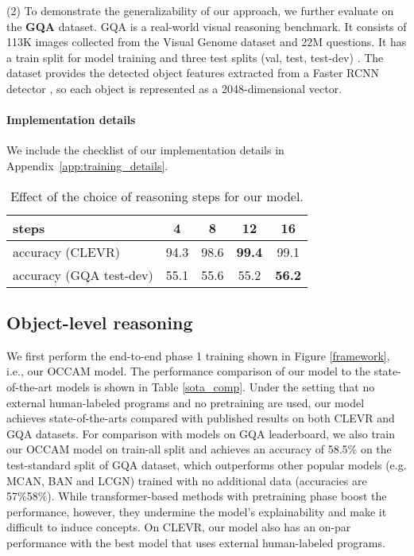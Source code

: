 \documentclass[10pt,twocolumn,letterpaper]{article}
\begin{document}
(2) To demonstrate the generalizability of our approach, we further evaluate on the \textbf{GQA} dataset.
GQA is a real-world visual reasoning benchmark. It consists of 113K images collected from the Visual Genome dataset \cite{krishna2017visual} and 22M questions. It has a train split for model training and three test splits (val, test, test-dev) \cite{hudson2019gqa}. The dataset provides the detected object features extracted from a Faster RCNN detector \cite{ren2015faster}, so each object is represented as a 2048-dimensional vector.


\vspace{-4mm}
\paragraph{Implementation details} We include the checklist of our implementation details in Appendix~\ref{app:training_details}.

\begin{table}[t!]
\small
    \centering
    \caption{\small{Effect of the choice of reasoning steps for our model.}}
    \begin{tabular}{l|cccc}
        \toprule
         steps & 4 & 8 & 12 & 16  \\
         \midrule
         accuracy (CLEVR) & 94.3 & 98.6 & \textbf{99.4} & 99.1 \\
         accuracy (GQA test-dev) & 55.1 & 55.6 & 55.2 & \textbf{56.2} \\
         \bottomrule
    \end{tabular}
    \label{ablation}
    \vspace{-3mm}
\end{table} \subsection{Object-level reasoning}
We first perform the end-to-end phase 1 training shown in Figure \ref{framework}, i.e., our OCCAM model. The performance comparison of our model to the state-of-the-art models is shown in Table \ref{sota_comp}. Under the setting that no external human-labeled programs and no pretraining are used, our model achieves state-of-the-arts compared with published results on both CLEVR and GQA datasets. For comparison with models on GQA leaderboard, we also train our OCCAM model on train-all split and achieves an accuracy of 58.5\% on the test-standard split of GQA dataset, which outperforms other popular models (e.g. MCAN, BAN and LCGN) trained with no additional data (accuracies are 57\%58\%). While transformer-based methods with pretraining phase boost the performance, however, they undermine the model’s explainability and make it difficult to induce concepts. On CLEVR, our model also has an on-par performance with the best model \cite{yi2018neural} that uses external human-labeled programs.
\end{document}

